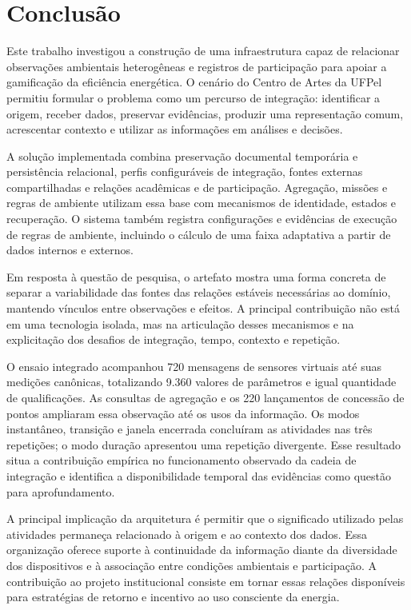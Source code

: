 \documentclass[tcc,capa]{texufpel}
\begin{document}
\chapter{Conclusão}\label{cap:conclusao}
Este trabalho investigou a construção de uma infraestrutura capaz de relacionar observações ambientais heterogêneas e registros de participação para apoiar a gamificação da eficiência energética. O cenário do Centro de Artes da UFPel permitiu formular o problema como um percurso de integração: identificar a origem, receber dados, preservar evidências, produzir uma representação comum, acrescentar contexto e utilizar as informações em análises e decisões.

A solução implementada combina preservação documental temporária e persistência relacional, perfis configuráveis de integração, fontes externas compartilhadas e relações acadêmicas e de participação. Agregação, missões e regras de ambiente utilizam essa base com mecanismos de identidade, estados e recuperação. O sistema também registra configurações e evidências de execução de regras de ambiente, incluindo o cálculo de uma faixa adaptativa a partir de dados internos e externos.

Em resposta à questão de pesquisa, o artefato mostra uma forma concreta de separar a variabilidade das fontes das relações estáveis necessárias ao domínio, mantendo vínculos entre observações e efeitos. A principal contribuição não está em uma tecnologia isolada, mas na articulação desses mecanismos e na explicitação dos desafios de integração, tempo, contexto e repetição.

O ensaio integrado acompanhou 720 mensagens de sensores virtuais até suas medições canônicas, totalizando 9.360 valores de parâmetros e igual quantidade de qualificações. As consultas de agregação e os 220 lançamentos de concessão de pontos ampliaram essa observação até os usos da informação. Os modos instantâneo, transição e janela encerrada concluíram as atividades nas três repetições; o modo duração apresentou uma repetição divergente. Esse resultado situa a contribuição empírica no funcionamento observado da cadeia de integração e identifica a disponibilidade temporal das evidências como questão para aprofundamento.

A principal implicação da arquitetura é permitir que o significado utilizado pelas atividades permaneça relacionado à origem e ao contexto dos dados. Essa organização oferece suporte à continuidade da informação diante da diversidade dos dispositivos e à associação entre condições ambientais e participação. A contribuição ao projeto institucional consiste em tornar essas relações disponíveis para estratégias de retorno e incentivo ao uso consciente da energia.
\end{document}

